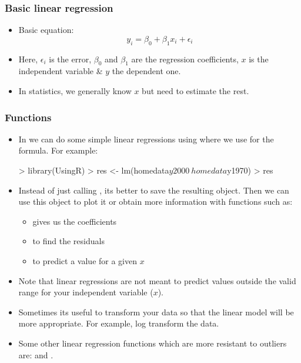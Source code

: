 \begin{frame}[allowframebreaks]
  \frametitle{Basic linear regression}
  \begin{itemize}
  \item Basic equation:
  \begin{equation}
  y_i = \beta_0 + \beta_1x_i + \epsilon_i
  \end{equation}
  \item Here, $\epsilon_i$ is the error, $\beta_0$ and $\beta_1$ are the regression coefficients, $x$ is the independent variable \& $y$ the dependent one.
  \item In statistics, we generally know $x$ but need to estimate the rest.
  \end{itemize}
\end{frame}

\begin{frame}
  \frametitle{Functions}
  \begin{itemize}  
  \item In  we can do some simple linear regressions using  where we use  for the formula. For example:
\begin{Schunk}
\begin{Sinput}
> library(UsingR)
> res <- lm(homedata$y2000 ~ homedata$y1970)
> res
\end{Sinput}
\end{Schunk}
  \item Instead of just calling , its better to save the resulting object. Then we can use this object to plot it or obtain more information with functions such as:
  \begin{itemize}
    \item {} gives us the coefficients
	\item {} to find the residuals
	\item {} to predict a value for a given $x$
  \end{itemize}
  \item \alert{Note} that linear regressions are not meant to predict values outside the valid range for your independent variable ($x$).
  \item Sometimes its useful to transform your data so that the linear model will be more appropriate. For example, log transform the data.
  \item Some other linear regression functions which are more resistant to outliers are:  and .
  \end{itemize}
\end{frame}

